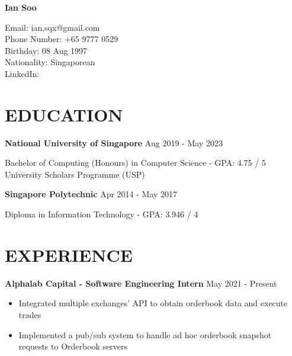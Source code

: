 \documentclass[11pt]{article} %
\begin{document}

{\LARGE\bfseries Ian Soo} %

Email: ian.sqx@gmail.com\\
Phone Number: +65 9777 0529\\
Birthday: 08 Aug 1997\\
Nationality: Singaporean\\
LinkedIn: \href{https://www.linkedin.com/in/sooian/}{\color{black}{https://www.linkedin.com/in/sooian/}}


\section*{EDUCATION}

\textbf{National University of Singapore} \hfill Aug 2019 - May 2023

Bachelor of Computing (Honours) in Computer Science - GPA: 4.75 / 5\\
University Scholars Programme (USP)

\medskip

\textbf{Singapore Polytechnic} \hfill Apr 2014 - May 2017

Diploma in Information Technology - GPA: 3.946 / 4


\section*{EXPERIENCE}

\textbf{Alphalab Capital - Software Engineering Intern} \hfill May 2021 - Present

\smallskip
\begin{itemize}

    \item Integrated multiple exchanges' API to obtain orderbook data and execute trades
    \item Implemented a pub/sub system to handle ad hoc orderbook snapshot requests to Orderbook servers

\end{itemize}
\end{document}
